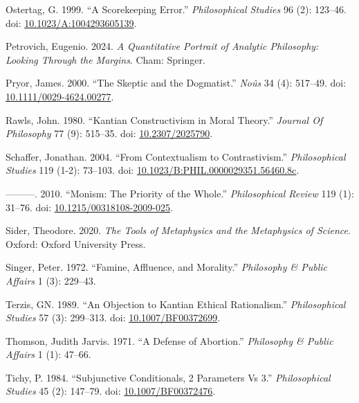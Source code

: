 \documentclass[
  10pt,
  letterpaper,
  DIV=11,
  numbers=noendperiod,
  twoside]{scrartcl}
\newlength{\cslhangindent}
\newenvironment{CSLReferences}[2] %
 {\begin{list}{}{%
  \setlength{\itemindent}{0pt}
  \setlength{\leftmargin}{0pt}
  \setlength{\parsep}{0pt}
  \ifodd #1
   \setlength{\leftmargin}{\cslhangindent}
   \setlength{\itemindent}{-1\cslhangindent}
  \fi
  \setlength{\itemsep}{#2\baselineskip}}}
 {\end{list}}
\begin{document}
\begin{CSLReferences}{1}{0}
Ostertag, G. 1999. {``A Scorekeeping Error.''} \emph{Philosophical
Studies} 96 (2): 123--46. doi:
\href{https://doi.org/10.1023/A:1004293605139}{10.1023/A:1004293605139}.

Petrovich, Eugenio. 2024. \emph{A Quantitative Portrait of Analytic
Philosophy: Looking Through the Margins}. Cham: Springer.

Pryor, James. 2000. {``The Skeptic and the Dogmatist.''} \emph{No{û}s}
34 (4): 517--49. doi:
\href{https://doi.org/10.1111/0029-4624.00277}{10.1111/0029-4624.00277}.

Rawls, John. 1980. {``Kantian Constructivism in Moral Theory.''}
\emph{Journal Of Philosophy} 77 (9): 515--35. doi:
\href{https://doi.org/10.2307/2025790}{10.2307/2025790}.

Schaffer, Jonathan. 2004. {``From Contextualism to Contrastivism.''}
\emph{Philosophical Studies} 119 (1-2): 73--103. doi:
\href{https://doi.org/10.1023/B:PHIL.0000029351.56460.8c}{10.1023/B:PHIL.0000029351.56460.8c}.

---------. 2010. {``Monism: The Priority of the Whole.''}
\emph{Philosophical Review} 119 (1): 31--76. doi:
\href{https://doi.org/10.1215/00318108-2009-025}{10.1215/00318108-2009-025}.

Sider, Theodore. 2020. \emph{The Tools of Metaphysics and the
Metaphysics of Science}. Oxford: Oxford University Press.

Singer, Peter. 1972. {``Famine, Affluence, and Morality.''}
\emph{Philosophy \& Public Affairs} 1 (3): 229--43.

Terzis, GN. 1989. {``An Objection to Kantian Ethical Rationalism.''}
\emph{Philosophical Studies} 57 (3): 299--313. doi:
\href{https://doi.org/10.1007/BF00372699}{10.1007/BF00372699}.

Thomson, Judith Jarvis. 1971. {``A Defense of Abortion.''}
\emph{Philosophy \& Public Affairs} 1 (1): 47--66.

Tichy, P. 1984. {``Subjunctive Conditionals, 2 Parameters Vs 3.''}
\emph{Philosophical Studies} 45 (2): 147--79. doi:
\href{https://doi.org/10.1007/BF00372476}{10.1007/BF00372476}.


\end{CSLReferences}
\end{document}
